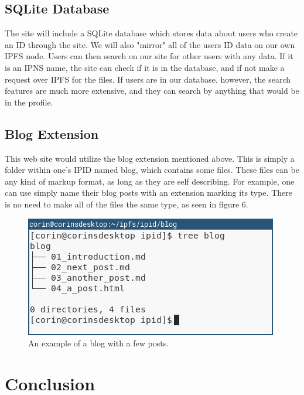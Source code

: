 \documentclass{article}
\begin{document}
\subsection{SQLite Database}

The site will include a SQLite database which stores data about users who create an ID through the site. We will also "mirror" all of the users ID data on our own IPFS node. Users can then search on our site for other users with any data. If it is an IPNS name, the site can check if it is in the database, and if not make a request over IPFS for the files. If users are in our database, however, the search features are much more extensive, and they can search by anything that would be in the profile. 

\subsection{Blog Extension}

This web site would utilize the blog extension mentioned above. This is simply a folder within one's IPID named blog, which contains some files. These files can be any kind of markup format, as long as they are self describing. For example, one can use simply name their blog posts with an extension marking its type. There is no need to make all of the files the same type, as seen in figure 6. 

\begin{figure}[h]
  \centering
  \includegraphics[width=.75\linewidth]{resources/blog_example.png}
  \caption{An example of a blog with a few posts.}
\end{figure}

\section{Conclusion}
\end{document}
